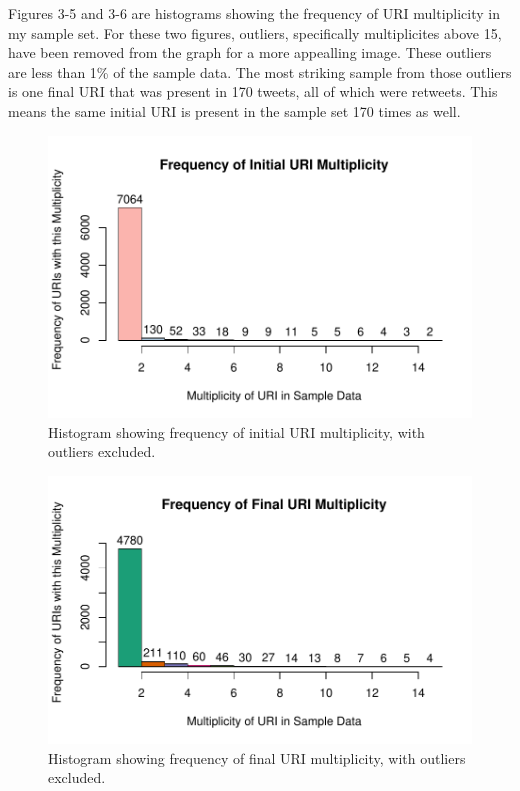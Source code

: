 \documentclass[a4paper,12pt]{article}
\begin{document}
Figures 3-5 and 3-6 are histograms showing the frequency of URI multiplicity in my sample set.
For these two figures, outliers, specifically multiplicites above 15, have been removed from the
graph for a more appealling image. These outliers are less than 1\% of the sample data. The most
striking sample from those outliers is one final URI that was present in 170 tweets, all of which
were retweets. This means the same initial URI is present in the sample set 170 times as well.
\begin{figure}[H]
    \centering
    \includegraphics{stats/frequency_initial_uri_multiplicity.pdf}
    \caption{Histogram showing frequency of initial URI multiplicity, with outliers excluded.}
\end{figure}
\begin{figure}[H]
    \centering
    \includegraphics{stats/frequency_final_uri_multiplicity.pdf}
    \caption{Histogram showing frequency of final URI multiplicity, with outliers excluded.}
\end{figure}
\end{document}
